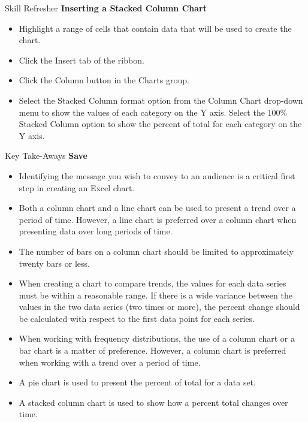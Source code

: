 \begin{center}
	\begin{sklbox}{Skill Refresher}
		\textbf{Inserting a Stacked Column Chart}
		\\
		\begin{itemize}
			\setlength{\itemsep}{0pt}
			\setlength{\parskip}{0pt}
			\setlength{\parsep}{0pt}

			\item Highlight a range of cells that contain data that will be used to create the chart.
			\item Click the Insert tab of the ribbon.
			\item Click the Column button in the Charts group.
			\item Select the Stacked Column format option from the Column Chart drop-down menu to show the values of each category on the Y axis. Select the 100\% Stacked Column option to show the percent of total for each category on the Y axis.
			
		\end{itemize}
	\end{sklbox}
\end{center}

\begin{center}
	\begin{tkwbox}{Key Take-Aways}
		\textbf{Save}
		\\
		\begin{itemize}
			\setlength{\itemsep}{0pt}
			\setlength{\parskip}{0pt}
			\setlength{\parsep}{0pt}
			
			\item Identifying the message you wish to convey to an audience is a critical first step in creating an Excel chart.
			\item Both a column chart and a line chart can be used to present a trend over a period of time. However, a line chart is preferred over a column chart when presenting data over long periods of time.
			\item The number of bars on a column chart should be limited to approximately twenty bars or less.
			\item When creating a chart to compare trends, the values for each data series must be within a reasonable range. If there is a wide variance between the values in the two data series (two times or more), the percent change should be calculated with respect to the first data point for each series.
			\item When working with frequency distributions, the use of a column chart or a bar chart is a matter of preference. However, a column chart is preferred when working with a trend over a period of time.
			\item A pie chart is used to present the percent of total for a data set.
			\item A stacked column chart is used to show how a percent total changes over time.

		\end{itemize}
	\end{tkwbox}
\end{center}


